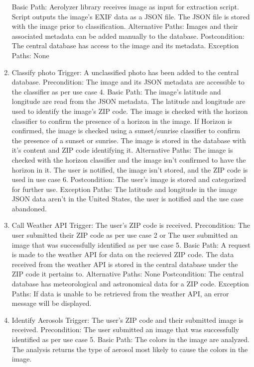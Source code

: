 \documentclass[journal,10pt,draftclsnofoot,onecolumn]{IEEEtran}
\begin{document}
\begin{singlespace}
\begin{enumerate}
Basic Path: 
Aerolyzer library receives image as input for extraction script.
Script outputs the image's EXIF data as a JSON file.
The JSON file is stored with the image prior to classification.
Alternative Paths: Images and their associated metadata can be added manually to the database.
Postcondition: The central database has access to the image and its metadata.
Exception Paths: None
\\
\item Classify photo
Trigger: A unclassified photo has been added to the central database.
Precondition: The image and its JSON metadata are accessible to the classifier as per use case 4.
Basic Path:
	The image's latitude and longitude are read from the JSON metadata.
	The latitude and longitude are used to identify the image's ZIP code.
The image is checked with the horizon classifier to confirm the presence of a horizon in the image.
If Horizon is confirmed, the image is checked using a sunset/sunrise classifier to confirm the presence of a sunset or sunrise.
	The image is stored in the database with it's content and ZIP code identifying it.
Alternative Paths: The image is checked with the horizon classifier and the image isn't confirmed to have the horizon in it. The user is notified, the image isn't stored, and the ZIP code is used in use case 6.
Postcondition: The user's image is stored and categorized for further use.
Exception Paths: The latitude and longitude in the image JSON data aren't in the United States, the user is notified and the use case abandoned.
\\
\item Call Weather API
Trigger: The user's ZIP code is received.
Precondition: The user submitted their ZIP code as per use case 2 or The user submitted an image that was successfully identified as per use case 5.
Basic Path:
A request is made to the weather API for data on the recieved ZIP code.
The data received from the weather API is stored in the central database under the ZIP code it pertains to.
Alternative Paths: None
Postcondition: The central database has meteorological and astronomical data for a ZIP code.
Exception Paths: If data is unable to be retrieved from the weather API, an error message will be displayed.
\\
\item Identify Aerosols
Trigger: The user's ZIP code and their submitted image is received.
Precondition: The user submitted an image that was successfully identified as per use case 5.
Basic Path:
The colors in the image are analyzed.
The analysis returns the type of aerosol most likely to cause the colors in the image.

\end{enumerate}
\end{singlespace}
\end{document}
